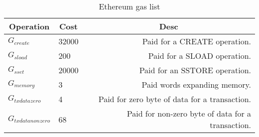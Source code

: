 \begin{table}[]
\centering
\begin{tabular}{@{}llr@{}}
\toprule
\multicolumn{1}{c}{Operation} & \multicolumn{1}{c}{Cost} & \multicolumn{1}{c}{Desc} \\
\midrule
$G_{create}$ & 32000 & Paid for a CREATE operation.\\
$G_{sload}$ & 200 & Paid for a SLOAD operation.\\
$G_{sset}$ & 20000 & Paid for an SSTORE operation.\\
$G_{memory}$ & 3 & Paid words expanding memory.\\
$G_{txdatazero}$ & 4 & Paid for zero byte of data for a transaction.\\
$G_{txdatanonzero}$ & 68 & Paid for non-zero byte of data for a transaction.\\
\end{tabular}
\caption{Ethereum gas list}
\label{table:ethereum_gas_list}
\end{table}
